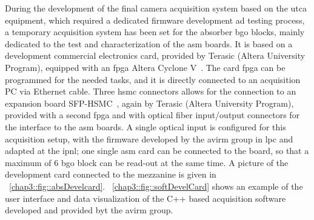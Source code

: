 During the development of the final camera acquisition system based on the \gls{utca} equipment, which required a dedicated firmware development ad testing process, a temporary acquisition system has been set for the absorber \gls{bgo} blocks, mainly dedicated to the test and characterization of the \gls{asm} boards. It is based on a development commercial electronics card, provided by Terasic (Altera University Program), equipped with an \gls{fpga} Altera Cyclone V~\parencite{Terasic2015}. The card \gls{fpga} can be programmed for the needed tasks, and it is directly connected to an acquisition PC via Ethernet cable. Three \gls{hsmc} connectors allows for the connection to an expansion board SFP-HSMC~\parencite{Terasic2009}, again by Terasic (Altera University Program), provided with a second \gls{fpga} and with optical fiber input/output connectors for the interface to the \gls{asm} boards. A single optical input is configured for this acquisition setup, with the firmware developed by the \gls{avirm} group in \gls{lpc} and adapted at the \gls{ipnl}; one single \gls{asm} card can be connected to the board, so that a maximum of 6 \gls{bgo} block can be read-out at the same time. A picture of the development card connected to the mezzanine is given in \figurename~\ref{chap3::fig::absDevelcard}. \figurename~\ref{chap3::fig::softDevelCard} shows an example of the user interface and data visualization of the C++ based acquisition software developed and provided byt the \gls{avirm} group.   


